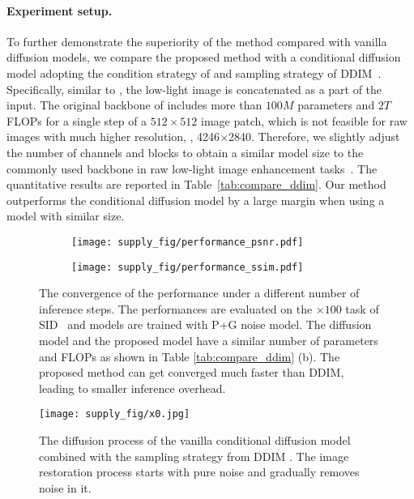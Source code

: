 \documentclass[10pt,twocolumn,letterpaper]{article}
\begin{document}
\paragraph{Experiment setup.} To further demonstrate the superiority of the method compared with vanilla diffusion models, we compare the proposed method with a conditional diffusion model adopting the condition strategy of \cite{saharia2022image} and sampling strategy of DDIM~\cite{song2020denoising}. Specifically, similar to \cite{saharia2022image}, the low-light image is concatenated as a part of the input. 
The original backbone of \cite{song2020denoising} includes more than $100M$ parameters and $2T$ FLOPs for a single step of a $512\times512$ image patch, which is not feasible for raw images with much higher resolution, \eg, 4246$\times$2840.
Therefore, we slightly adjust the number of channels and blocks to obtain a similar model size to the commonly used backbone in raw low-light image enhancement tasks~\cite{wei2020physics,feng2022learnability}. The quantitative results are reported in Table~\ref{tab:compare_ddim}. Our method outperforms the conditional diffusion model by a large margin when using a model with similar size.



\begin{figure}[t]
    \centering
    \begin{subfigure}{0.49\linewidth}
\texttt{[image: supply\_fig/performance\_psnr.pdf]}
\end{subfigure}
\begin{subfigure}{0.49\linewidth}
\texttt{[image: supply\_fig/performance\_ssim.pdf]}
\end{subfigure}
    \caption{The convergence of the performance under a different number of inference steps. The performances are evaluated on the $\times 100$ task of SID~\cite{chen2018learning} and models are trained with P+G noise model. The diffusion model and the proposed model have a similar number of parameters and FLOPs as shown in Table \ref{tab:compare_ddim} (b). The proposed method can get converged much faster than DDIM, leading to smaller inference overhead.}
    \label{fig:convergence}
\end{figure}

\begin{figure*}[t]
    \centering
    \texttt{[image: supply\_fig/x0.jpg]}
    \caption{The diffusion process of the vanilla conditional diffusion model~\cite{saharia2022image} combined with the sampling strategy from DDIM \cite{song2020denoising}. The image restoration process starts with pure noise and gradually removes noise in it.}
    \label{fig:diffusion_xt}
\end{figure*}
\end{document}
